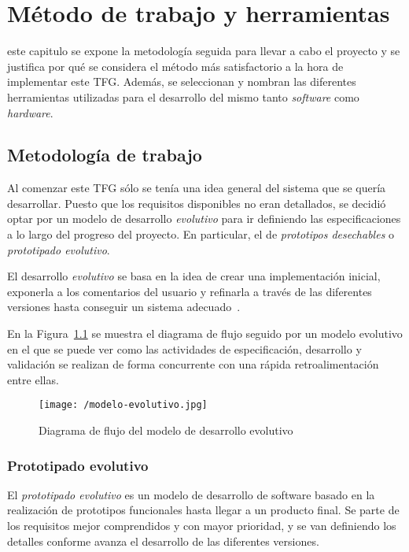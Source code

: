 \chapter{Método de trabajo y herramientas}
\label{chap:metodo}

 este capitulo se expone la metodología seguida para llevar a cabo el proyecto y se
justifica por qué se considera el método más satisfactorio a la hora de implementar este
\acs{TFG}. Además, se seleccionan y nombran las diferentes herramientas utilizadas para el
desarrollo del mismo tanto \emph{software} como \emph{hardware}.

\section{Metodología de trabajo}
\label{sec:metodologia}

Al comenzar este \acs{TFG} sólo se tenía una idea general del sistema que se quería
desarrollar. Puesto que los requisitos disponibles no eran detallados, se decidió optar por un
modelo de desarrollo \emph{evolutivo} para ir definiendo las especificaciones a lo largo del
progreso del proyecto. En particular, el de \emph{prototipos desechables} o \emph{prototipado
  evolutivo}.

El desarrollo \emph{evolutivo} se basa en la idea de crear una implementación inicial,
exponerla a los comentarios del usuario y refinarla a través de las diferentes versiones hasta
conseguir un sistema adecuado~\cite{Sommerville14}.

En la Figura~\ref{fig:modelo-evolutivo} se muestra el diagrama de flujo seguido por un modelo
evolutivo en el que se puede ver como las actividades de especificación, desarrollo y validación se
realizan de forma concurrente con una rápida retroalimentación entre ellas.

\begin{figure}[!h]
  \begin{center}
    \texttt{[image: /modelo-evolutivo.jpg]}
    \caption{Diagrama de flujo del modelo de desarrollo evolutivo}
    \label{fig:modelo-evolutivo}
  \end{center}
\end{figure}

\subsection{Prototipado evolutivo}

El \emph{prototipado evolutivo} es un modelo de desarrollo de software basado en la realización de
prototipos funcionales hasta llegar a un producto final. Se parte de los requisitos mejor
comprendidos y con mayor prioridad, y se van definiendo los detalles conforme avanza el desarrollo
de las diferentes versiones.

